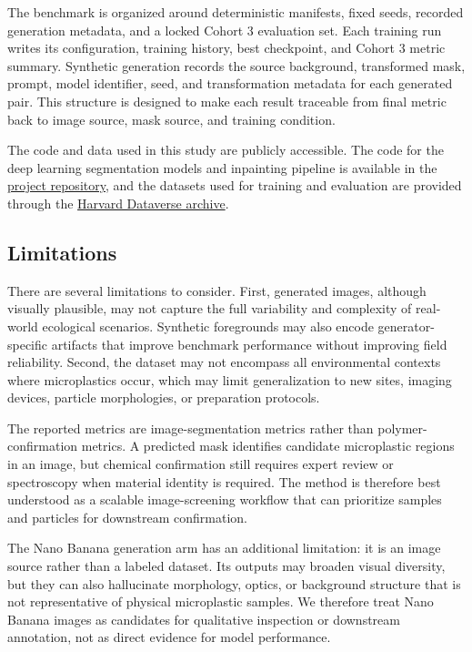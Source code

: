 \documentclass{article}
\begin{document}
The benchmark is organized around deterministic manifests, fixed seeds, recorded generation metadata, and a locked Cohort 3 evaluation set. Each training run writes its configuration, training history, best checkpoint, and Cohort 3 metric summary. Synthetic generation records the source background, transformed mask, prompt, model identifier, seed, and transformation metadata for each generated pair. This structure is designed to make each result traceable from final metric back to image source, mask source, and training condition.

The code and data used in this study are publicly accessible. The code for the deep learning segmentation models and inpainting pipeline is available in the \href{https://github.com/axel-slid/Microplastic-Segmentation-GAN/tree/main}{project repository}, and the datasets used for training and evaluation are provided through the \href{https://dataverse.harvard.edu/dataverse/Microplastic-Segmentation-GAN/}{Harvard Dataverse archive}.

\subsection{Limitations}

There are several limitations to consider. First, generated images, although visually plausible, may not capture the full variability and complexity of real-world ecological scenarios. Synthetic foregrounds may also encode generator-specific artifacts that improve benchmark performance without improving field reliability. Second, the dataset may not encompass all environmental contexts where microplastics occur, which may limit generalization to new sites, imaging devices, particle morphologies, or preparation protocols.

The reported metrics are image-segmentation metrics rather than polymer-confirmation metrics. A predicted mask identifies candidate microplastic regions in an image, but chemical confirmation still requires expert review or spectroscopy when material identity is required. The method is therefore best understood as a scalable image-screening workflow that can prioritize samples and particles for downstream confirmation.

The Nano Banana generation arm has an additional limitation: it is an image source rather than a labeled dataset. Its outputs may broaden visual diversity, but they can also hallucinate morphology, optics, or background structure that is not representative of physical microplastic samples. We therefore treat Nano Banana images as candidates for qualitative inspection or downstream annotation, not as direct evidence for model performance.
\end{document}
